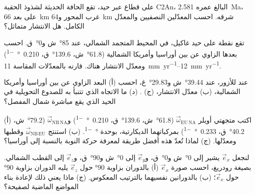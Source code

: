 \begin{exercise}[$\star$]\label{exo:b1:plate-kinematics:4}
على قطاع عبر حيد، تقع الحافة الحديثة لشذوذ الحقبة C2An، البالغ عمره \qty{2.581}{Ma}، على بعد \qty{66}{km} غرب المحور و\qty{64}{km} شرقه. احسب المعدّلين النصفيين والمعدّل الكامل. هل الانتشار متماثل؟
\end{exercise}

\begin{exercise}[$\star\star$]\label{exo:b1:plate-kinematics:5}
تقع نقطة على حيد غاكيل، في المحيط المتجمد الشمالي، عند \ang{85}~ش و\ang{0}~ق. احسب بعدها الزاوي عن  بين أوراسيا وأمريكا الشمالية (\ang{61.8}~ش، \ang{139.6}~ق، \qty{0.210}{\degree\per\Myr}) ومعدّل الانتشار هناك. قارنه بالمعدّلات المقاسة \qtyrange{11}{12}{mm.yr^{-1}}.
\end{exercise}

\begin{exercise}[$\star\star$]\label{exo:b1:plate-kinematics:6}
عند  للأزور، عند \ang{39.44}~ش و\ang{29.83}~غ، احسب (أ) البعد الزاوي عن  بين أوراسيا وأمريكا الشمالية، (ب) معدّل الانتشار، (ج) . (د) ما الاتجاه الذي تتنبأ به للصدوع التحويلية في الحيد الذي يقع مباشرة شمال المفصل؟
\end{exercise}

\begin{exercise}[$\star\star$]\label{exo:b1:plate-kinematics:7}
(أ) اكتب متجهتي أويلر $\vec\omega_{\mathrm{EU\,NA}}$ (\ang{61.8}~ش، \ang{139.6}~ق، \qty{0.210}{\degree\per\Myr}) و$\vec\omega_{\mathrm{NB\,NA}}$ (\ang{79.2}~ش، \ang{40.2}~ق، \qty{0.233}{\degree\per\Myr}) بمركباتهما الديكارتية، بوحدة \unit{\degree\per\Myr}. (ب) استنتج $\vec\omega_{\mathrm{NB\,EU}}$ وقطبها ومعدّلها. (ج) لماذا تُعدّ هذه أفضل طريقة لمعرفة حركة النوبة بالنسبة إلى أوراسيا؟
\end{exercise}

\begin{exercise}[$\star\star$]\label{exo:b1:plate-kinematics:8}
لنجعل $\vec e_x$ يشير إلى \ang{0}~ش و\ang{0}~ق، و$\vec e_y$ إلى \ang{0}~ش و\ang{90}~ق، و$\vec e_z$ إلى القطب الشمالي. بصيغة رودريغ، احسب صورة $\vec e_x$ (أ) بالدوران بزاوية \ang{90} حول $\vec e_z$ يليه الدوران بزاوية \ang{90} حول $\vec e_x$؛ (ب) بالدورانين نفسيهما بالترتيب المعكوس. (ج) ماذا يعني ذلك لإعادة بناء المواضع الماضية لصفيحة؟
\end{exercise}

